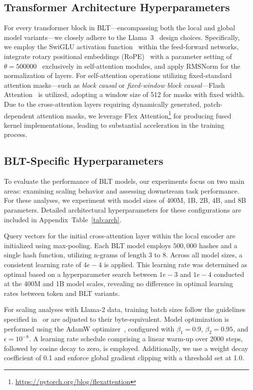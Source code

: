 \subsection{Transformer Architecture Hyperparameters} 
For every transformer block in {\textsc BLT}—encompassing both the local and global model variants—we closely adhere to the Llama~3~\citep{dubey2024llama} design choices. Specifically, we employ the SwiGLU activation function~\citep{swiglu} within the feed-forward networks, integrate rotary positional embeddings (RoPE)~\citep{RoPe} with a parameter setting of $\theta=500000$~\citep{xiong2024effective} exclusively in self-attention modules, and apply RMSNorm \citep{RMSNorm} for the normalization of layers. For self-attention operations utilizing fixed-standard attention masks—such as \textit{block causal} or \textit{fixed-window block causal}—Flash Attention~\citep{dao2022flashattention} is utilized, adopting a window size of 512 for masks with fixed width. Due to the cross-attention layers requiring dynamically generated, patch-dependent attention masks, we leverage Flex Attention\footnote{\url{https://pytorch.org/blog/flexattention}} for producing fused kernel implementations, leading to substantial acceleration in the training process.

\subsection{{\textsc BLT}-Specific Hyperparameters} 

To evaluate the performance of {\textsc BLT} models, our experiments focus on two main areas: examining scaling behavior and assessing downstream task performance. For these analyses, we experiment with model sizes of 400M, 1B, 2B, 4B, and 8B parameters. Detailed architectural hyperparameters for these configurations are included in Appendix~Table~\ref{tab:arch}.

Query vectors for the initial cross-attention layer within the local encoder are initialized using max-pooling. Each {\textsc BLT} model employs $500,000$ hashes and a single hash function, utilizing n-grams of length 3 to 8. Across all model sizes, a consistent learning rate of $4e-4$ is applied. This learning rate was determined as optimal based on a hyperparameter search between $1e-3$ and $1e-4$ conducted at the 400M and 1B model scales, revealing no difference in optimal learning rates between token and {\textsc BLT} variants.

For scaling analyses with Llama-2 data, training batch sizes follow the guidelines specified in~\cite{dubey2024llama} or are adjusted to their byte-equivalent. Model optimization is performed using the AdamW optimizer~\citep{adamw}, configured with $\beta_1 = 0.9$, $\beta_2 = 0.95$, and $\epsilon = 10^{-8}$. A learning rate schedule comprising a linear warm-up over 2000 steps, followed by cosine decay to zero, is employed. Additionally, we use a weight decay coefficient of 0.1 and enforce global gradient clipping with a threshold set at 1.0.

